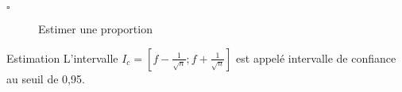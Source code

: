 \begin{titre}[Probabilités]

\end{titre}


\begin{CpsCol}
\begin{description}
\item[$\square$] Estimer une proportion
\end{description}
\end{CpsCol}



\begin{DefT}{Estimation}
L'intervalle $I_c=\left[ f - \frac{1}{\sqrt{n}}; f + \frac{1}{\sqrt{n}} \right]$ est appelé intervalle de confiance au seuil de 0,95.
\end{DefT}




